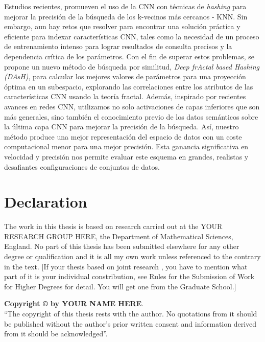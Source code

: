 Estudios recientes, promueven el uso de la \acf{CNN} con técnicas de  \textit{hashing} para mejorar la precisión de la búsqueda de los k-vecinos más cercanos - KNN.  Sin embargo, aun hay retos que resolver para encontrar una solución práctica y eficiente para indexar características  CNN, tales como la necesidad de un proceso de entrenamiento intenso para lograr resultados de consulta precisos y la dependencia crítica de los parámetros.   Con el fin de superar estos problemas, se propone un nuevo método de búsqueda por similitud, \textit{Deep frActal based  Hashing (DAsH)}, para calcular los mejores valores de parámetros  para una proyección óptima en un subespacio, explorando las correlaciones entre los atributos de las características  CNN usando la teoría fractal. Además, inspirado por recientes avances  en redes CNN, utilizamos no solo activaciones de capas inferiores que son más generales, sino también el conocimiento previo de los datos semánticos sobre la última capa CNN para mejorar la precisión de la búsqueda.  Así, nuestro método produce una mejor representación del espacio de datos con un coste computacional menor para una mejor precisión. Esta ganancia significativa en velocidad y precisión nos permite evaluar este esquema en grandes,  realistas y desafiantes  configuraciones de conjuntos de datos.


\chapter*{Declaration}
The work in this thesis is based on research carried out at the
YOUR RESEARCH GROUP HERE, the Department of Mathematical Sciences, England. No part of this thesis has been submitted elsewhere for any other degree or qualification and it is all
my own work unless referenced to the contrary in the text. [If your thesis based on joint research , you have to mention what part of it is your individual constribution, see Rules for the Submission of Work for Higher Degrees for detail. You will get one from the Graduate School.]



\vspace{2in}
\noindent \textbf{Copyright \copyright{} by YOUR NAME HERE}.\\
``The copyright of this thesis rests with the author.  No quotations
from it should be published without the author's prior written consent
and information derived from it should be acknowledged''.



